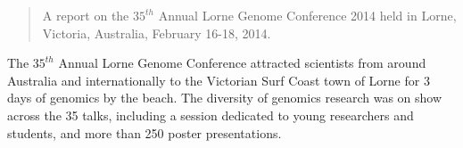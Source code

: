 \documentclass[twocolumn]{bmcart}%
\begin{document}
\begin{frontmatter}
\begin{fmbox}
\begin{abstractbox}
\begin{abstract} %
A report on the $35^{th}$ Annual Lorne Genome Conference 2014 held in Lorne, Victoria, Australia, February 16-18, 2014. 
\end{abstract}


\begin{keyword}
\end{keyword}


\end{abstractbox}
%
\end{fmbox}%

\end{frontmatter}




The $35^{th}$ Annual Lorne Genome Conference attracted scientists from around Australia and internationally to the Victorian Surf Coast town of Lorne for 3 days of genomics by the beach. The diversity of genomics research was on show across the 35 talks, including a session dedicated to young researchers and students, and more than 250 poster presentations.
\end{document}
